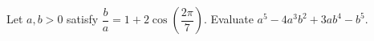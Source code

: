 Let $a,b>0$ satisfy $\dfrac{b}{a} = 1 + 2 \cos (\dfrac{2 \pi}{7})$. Evaluate $a^5-4a^3b^2+3ab^4-b^5$.
